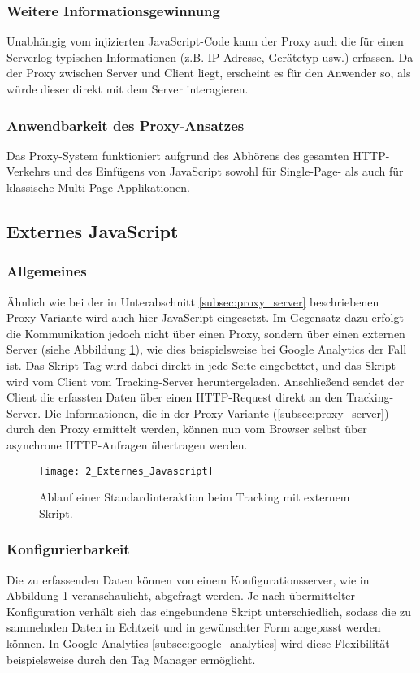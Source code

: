 \subsubsection{Weitere Informationsgewinnung}
Unabhängig vom injizierten JavaScript-Code kann der Proxy auch die für einen Serverlog typischen Informationen (z.B. IP-Adresse, Gerätetyp usw.) erfassen. Da der Proxy zwischen Server und Client liegt, erscheint es für den Anwender so, als würde dieser direkt mit dem Server interagieren.

\subsubsection{Anwendbarkeit des Proxy-Ansatzes}
Das Proxy-System funktioniert aufgrund des Abhörens des gesamten HTTP-Verkehrs und des Einfügens von JavaScript sowohl für Single-Page- als auch für klassische Multi-Page-Applikationen.

\subsection{Externes JavaScript}
\label{subsec:external_js}

\subsubsection{Allgemeines}
Ähnlich wie bei der in Unterabschnitt \ref{subsec:proxy_server} beschriebenen Proxy-Variante wird auch hier JavaScript eingesetzt. Im Gegensatz dazu erfolgt die Kommunikation jedoch nicht über einen Proxy, sondern über einen externen Server (siehe Abbildung \ref{fig:external_javascript}), wie dies beispielsweise bei Google Analytics \cite{weber2015practical} der Fall ist. Das Skript-Tag wird dabei direkt in jede Seite eingebettet, und das Skript wird vom Client vom Tracking-Server heruntergeladen. Anschließend sendet der Client die erfassten Daten über einen HTTP-Request direkt an den Tracking-Server.  
Die Informationen, die in der Proxy-Variante (\ref{subsec:proxy_server}) durch den Proxy ermittelt werden, können nun vom Browser selbst über asynchrone HTTP-Anfragen übertragen werden.

\begin{figure}[H]
\centering
\texttt{[image: 2\_Externes\_Javascript]}
\caption{Ablauf einer Standardinteraktion beim Tracking mit externem Skript.}
\label{fig:external_javascript}
\end{figure}

\subsubsection{Konfigurierbarkeit}
Die zu erfassenden Daten können von einem Konfigurationsserver, wie in Abbildung \ref{fig:external_javascript} veranschaulicht, abgefragt werden. Je nach übermittelter Konfiguration verhält sich das eingebundene Skript unterschiedlich, sodass die zu sammelnden Daten in Echtzeit und in gewünschter Form angepasst werden können. In Google Analytics \ref{subsec:google_analytics} wird diese Flexibilität beispielsweise durch den Tag Manager ermöglicht.

